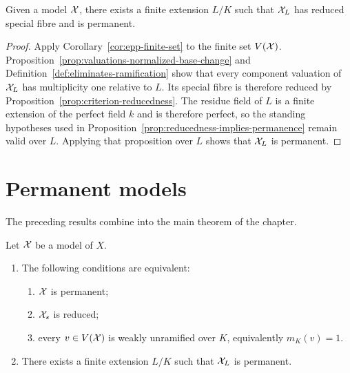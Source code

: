 \begin{corollary}\label{cor:permanent-normalized-base-change}
    Given a model $\mathcal X$, there exists a finite extension $L/K$ such that $\mathcal X_L$ has reduced special fibre and is permanent.
\end{corollary}

\begin{proof}
    Apply Corollary~\ref{cor:epp-finite-set} to the finite set $V(\mathcal X)$.
    Proposition~\ref{prop:valuations-normalized-base-change} and Definition~\ref{def:eliminates-ramification} show that every component valuation of $\mathcal X_L$ has multiplicity one relative to $L$.
    Its special fibre is therefore reduced by Proposition~\ref{prop:criterion-reducedness}.
    The residue field of $L$ is a finite extension of the perfect field $k$ and is therefore perfect, so the standing hypotheses used in Proposition~\ref{prop:reducedness-implies-permanence} remain valid over $L$.
    Applying that proposition over $L$ shows that $\mathcal X_L$ is permanent.
\end{proof}

\section{Permanent models}\label{sec:permanent-models}

The preceding results combine into the main theorem of the chapter.

\begin{theorem}\label{thm:permanence}
    Let $\mathcal X$ be a model of $X$.
    \begin{enumerate}[label=\textup{(\roman*)}]
        \item\label{thm:permanence-i} The following conditions are equivalent:
        \begin{enumerate}[label=\textup{(\alph*)}]
            \item\label{thm:permanence-i-a} $\mathcal X$ is permanent;
            \item\label{thm:permanence-i-b} $\mathcal X_s$ is reduced;
            \item\label{thm:permanence-i-c} every $v\in V(\mathcal X)$ is weakly unramified over $K$, equivalently $m_K(v)=1$.
        \end{enumerate}
        \item\label{thm:permanence-ii} There exists a finite extension $L/K$ such that $\mathcal X_L$ is permanent.
    \end{enumerate}
\end{theorem}

